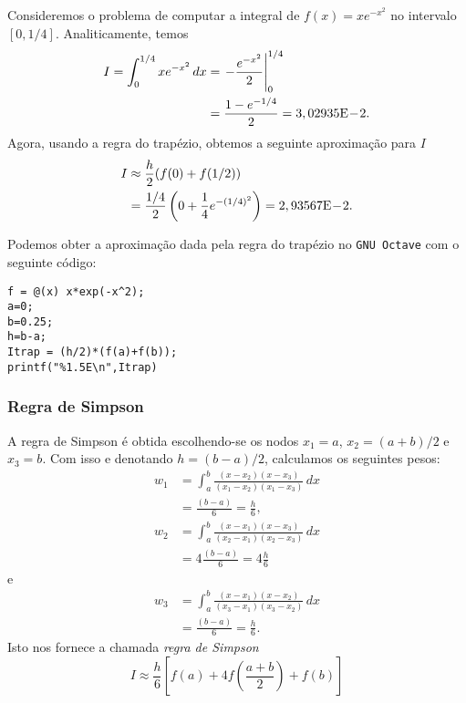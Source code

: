 \begin{ex}\label{ex:int_trap}
  Consideremos o problema de computar a integral de $f(x)=xe^{-x^2}$ no intervalo $[0, 1/4]$. Analiticamente, temos
  \begin{align}
    I = \int_0^{1/4} xe^{-x^2}\,dx &= \left. -\frac{e^{-x^2}}{2} \right|_0^{1/4}\\
    &= \frac{1-e^{-1/4}}{2} = 3,02935\mathrm{E}\!-\!2.
  \end{align}
Agora, usando a regra do trapézio, obtemos a seguinte aproximação para $I$
\begin{align}
  I &\approx \frac{h}{2}(f(0) + f(1/2))\\
  &= \frac{1/4}{2}\left(0 + \frac{1}{4}e^{-(1/4)^2}\right) = 2,93567\mathrm{E}\!-\!2.
\end{align}

\ifisoctave
Podemos obter a aproximação dada pela regra do trapézio no \verb+GNU Octave+ com o seguinte código:
\begin{verbatim}
f = @(x) x*exp(-x^2);
a=0;
b=0.25;
h=b-a;
Itrap = (h/2)*(f(a)+f(b));
printf("%1.5E\n",Itrap)
\end{verbatim}
\fi
\end{ex}

\subsubsection{Regra de Simpson}

A regra de Simpson é obtida escolhendo-se os nodos $x_1=a$, $x_2=(a+b)/2$ e $x_3=b$. Com isso e denotando $h=(b-a)/2$, calculamos os seguintes pesos:
\begin{align}
  w_1 &= \int_a^b\frac{(x-x_2)(x-x_3)}{(x_1-x_2)(x_1-x_3)}\,dx\\
  &= \frac{(b-a)}{6} = \frac{h}{6},
\end{align}
\begin{align}
  w_2 &= \int_a^b\frac{(x-x_1)(x-x_3)}{(x_2-x_1)(x_2-x_3)}\,dx\\
  &= 4\frac{(b-a)}{6} = 4\frac{h}{6}
\end{align}
e
\begin{align}
  w_3 &= \int_a^b\frac{(x-x_1)(x-x_2)}{(x_3-x_1)(x_3-x_2)}\,dx\\
  &= \frac{(b-a)}{6} = \frac{h}{6}.
\end{align}
Isto nos fornece a chamada \emph{regra de Simpson}
\begin{equation}\label{eq:aux_Simpson}
  I \approx \frac{h}{6}\left[f(a) + 4f\left(\frac{a+b}{2}\right) + f(b)\right]
\end{equation}

